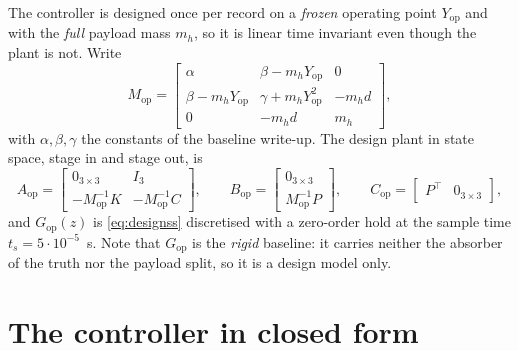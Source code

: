 \documentclass[11pt]{article}
\newcommand{\Gop}{G_{\mathrm{op}}}
\begin{document}
The controller is designed once per record on a \emph{frozen} operating point $Y_{\mathrm{op}}$
and with the \emph{full} payload mass $m_h$, so it is linear time invariant even though the plant
is not. Write
\begin{equation}
  M_{\mathrm{op}} =
  \begin{bmatrix}
    \alpha                            & \beta - m_h Y_{\mathrm{op}}                & 0 \\[2mm]
    \beta - m_h Y_{\mathrm{op}}       & \gamma + m_h Y_{\mathrm{op}}^2             & -m_h d \\[2mm]
    0                                 & -m_h d                                     & m_h
  \end{bmatrix},
  \label{eq:Mop}
\end{equation}
with $\alpha,\beta,\gamma$ the constants of the baseline write-up. The design plant in state
space, stage in and stage out, is
\begin{equation}
  A_{\mathrm{op}} =
  \begin{bmatrix}
    0_{3\times3} & I_3 \\[2mm]
    -M_{\mathrm{op}}^{-1}K & -M_{\mathrm{op}}^{-1}C
  \end{bmatrix},
  \qquad
  B_{\mathrm{op}} =
  \begin{bmatrix}
    0_{3\times3} \\[2mm]
    M_{\mathrm{op}}^{-1}P
  \end{bmatrix},
  \qquad
  C_{\mathrm{op}} =
  \begin{bmatrix}
    P^\top & 0_{3\times3}
  \end{bmatrix},
  \label{eq:designss}
\end{equation}
and $\Gop(z)$ is \eqref{eq:designss} discretised with a zero-order hold at the sample time
$t_s = 5\cdot10^{-5}$~s. Note that $\Gop$ is the \emph{rigid} baseline: it carries neither the
absorber of the truth nor the payload split, so it is a design model only.

\section{The controller in closed form}
\label{sec:ctrl}
\end{document}
